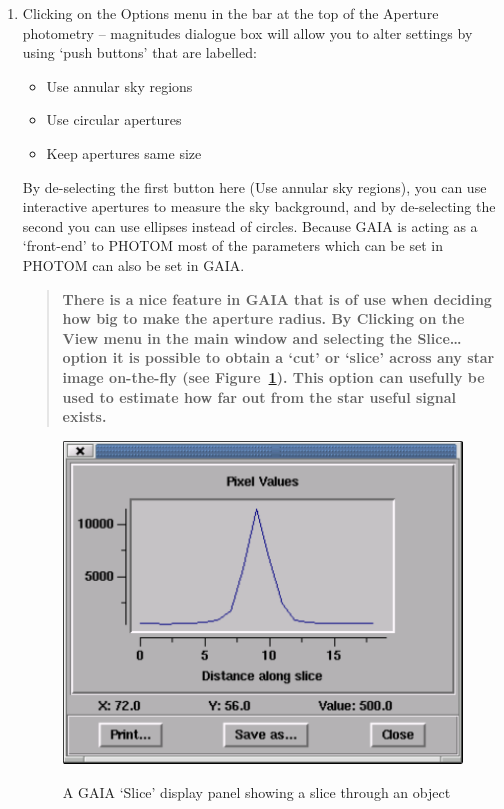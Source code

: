 \documentclass[twoside,11pt,nolof]{starlink}
\begin{document}
\begin{enumerate}
  \item Clicking on the \textsf{Options} menu in the bar at the top of the
   \textsf{Aperture photometry -- magnitudes} dialogue box will allow you to
   alter settings by using `push buttons' that are labelled:

  \begin{itemize}

     \item \textsf{Use annular sky regions}

     \item \textsf{Use circular apertures}

     \item \textsf{Keep apertures same size}

  \end{itemize}

   By de-selecting the first button here (\textsf{Use annular sky
   regions}), you can use interactive apertures to measure the sky
   background, and by de-selecting the second you can use ellipses
   instead of circles.  Because GAIA is acting as a `front-end' to
   PHOTOM most of the parameters which can be set in PHOTOM can also
   be set in GAIA.

  \begin{quote}
   \textbf{There is a nice feature in GAIA that is of use when deciding how
   big to make the aperture radius. By Clicking on the \textsf{View} menu
   in the main window and selecting the \textsf{Slice\ldots} option it is
   possible to obtain a `cut' or `slice' across any star image on-the-fly
   (see Figure~\ref{g6}).  This option can usefully be used to estimate
   how far out from the star useful signal exists.}
  \end{quote}

  \begin{figure}[htbp]
     \centering
     \includegraphics[totalheight=3.25in]{sc6_gaia3}
     \begin{quote}
     \caption[A GAIA `\textsf{Slice}' display panel]
      {A GAIA `\textsf{Slice}' display panel showing a slice through an object
     \label{g6} }
     \end{quote}
  \end{figure}


\end{enumerate}
\end{document}
